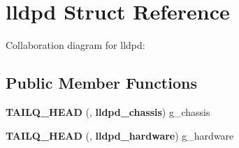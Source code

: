 \section{lldpd \-Struct \-Reference}
\label{structlldpd}


\-Collaboration diagram for lldpd\-:
\subsection*{\-Public \-Member \-Functions}
\begin{DoxyCompactItemize}
\item 
{\bfseries \-T\-A\-I\-L\-Q\-\_\-\-H\-E\-A\-D} (, {\bf lldpd\-\_\-chassis}) g\-\_\-chassis\label{structlldpd_aa8d558fcc177e67a892c9779ffece555}

\item 
{\bfseries \-T\-A\-I\-L\-Q\-\_\-\-H\-E\-A\-D} (, {\bf lldpd\-\_\-hardware}) g\-\_\-hardware\label{structlldpd_aeb32e73350ab7695878725ecd328a8a3}

\end{DoxyCompactItemize}
